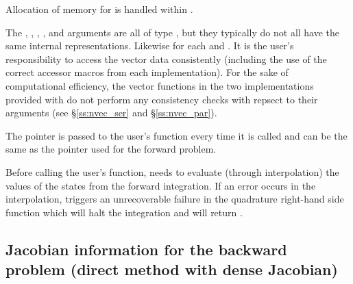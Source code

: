 {
  Allocation of memory for  is handled within {\idas}.

  The , , , , and  arguments are all 
  of type , but they typically do not all have the same internal
  representations.  Likewise for each  and .  It is the user's 
  responsibility to access the vector data consistently (including the use of the 
  correct accessor macros from each {\nvector} implementation). For the sake of 
  computational efficiency, the vector functions in the two {\nvector} implementations 
  provided with {\idas} do not perform any consistency checks with repsect to their 
   arguments (see \S\ref{ss:nvec_ser} and \S\ref{ss:nvec_par}).

  The  pointer is passed to the user's  function every time 
  it is called and can be the same as the  pointer used for the forward
  problem.

  {\warn}Before calling the user's  function, {\idas} needs to evaluate
  (through interpolation) the values of the states from the forward integration.
  If an error occurs in the interpolation, {\idas} triggers an unrecoverable
  failure in the quadrature right-hand side function which will halt the integration and
   will return .
}


\subsection{Jacobian information for the backward problem 
  (direct method with dense Jacobian)}\label{ss:densejac_b}
  
